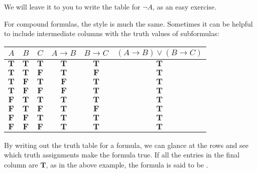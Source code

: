 \documentclass[letterpaper,10pt,english]{sphinxmanual}
\begin{document}
\sphinxAtStartPar
We will leave it to you to write the table for \(\neg A\), as an easy exercise.

\sphinxAtStartPar
For compound formulas, the style is much the same. Sometimes it can be helpful to include intermediate columns with the truth values of subformulas:



\begin{center}
\begin{tabular} {|c|c|c||c|c||c|}
\hline
$A$          & $B$          & $C$          & $A \to B$  & $B \to C$      & $(A \to B) \vee (B \to C)$ \\ \hline
$\mathbf{T}$ & $\mathbf{T}$ & $\mathbf{T}$ & $\mathbf{T}$ & $\mathbf{T}$ & $\mathbf{T}$   \\ \hline
$\mathbf{T}$ & $\mathbf{T}$ & $\mathbf{F}$ & $\mathbf{T}$ & $\mathbf{F}$ & $\mathbf{T}$   \\ \hline
$\mathbf{T}$ & $\mathbf{F}$ & $\mathbf{T}$ & $\mathbf{F}$ & $\mathbf{T}$ & $\mathbf{T}$   \\ \hline
$\mathbf{T}$ & $\mathbf{F}$ & $\mathbf{F}$ & $\mathbf{F}$ & $\mathbf{T}$ & $\mathbf{T}$   \\ \hline
$\mathbf{F}$ & $\mathbf{T}$ & $\mathbf{T}$ & $\mathbf{T}$ & $\mathbf{T}$ & $\mathbf{T}$   \\ \hline
$\mathbf{F}$ & $\mathbf{T}$ & $\mathbf{F}$ & $\mathbf{T}$ & $\mathbf{F}$ & $\mathbf{T}$   \\ \hline
$\mathbf{F}$ & $\mathbf{F}$ & $\mathbf{T}$ & $\mathbf{T}$ & $\mathbf{T}$ & $\mathbf{T}$   \\ \hline
$\mathbf{F}$ & $\mathbf{F}$ & $\mathbf{F}$ & $\mathbf{T}$ & $\mathbf{T}$ & $\mathbf{T}$   \\ \hline
\end{tabular}
\end{center}

\sphinxAtStartPar
By writing out the truth table for a formula, we can glance at the rows and see which truth assignments make the formula true. If all the entries in the final column are \(\mathbf{T}\), as in the above example, the formula is said to be .
\end{document}
